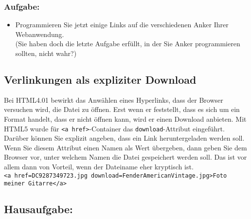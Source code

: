 \subsubsection{Aufgabe:}

\begin{itemize}
	\item Programmieren Sie jetzt einige Links auf die verschiedenen Anker Ihrer Webanwendung.\\
	
	(Sie haben doch die letzte Aufgabe erfüllt, in der Sie Anker programmieren sollten, nicht wahr?)
\end{itemize}

\subsection{Verlinkungen als expliziter Download}

Bei HTML4.01 bewirkt das Anwählen eines Hyperlinks, dass der Browser versuchen wird, die Datei zu öffnen. Erst wenn er feststellt, dass es sich um ein Format handelt, dass er nicht öffnen kann, wird er einen Download anbieten. Mit HTML5 wurde für \verb|<a href>|-Container das \verb|download|-Attribut eingeführt. Darüber können Sie explizit angeben, dass ein Link heruntergeladen werden soll.\\

Wenn Sie diesem Attribut einen Namen als Wert übergeben, dann geben Sie dem Browser vor, unter welchem Namen die Datei gespeichert werden soll. Das ist vor allem dann von Vorteil, wenn der Dateiname eher kryptisch ist.\\

\verb|<a href=DC9287349723.jpg download=FenderAmericanVintage.jpg>Foto meiner Gitarre</a>|

\subsection{Hausaufgabe:}

